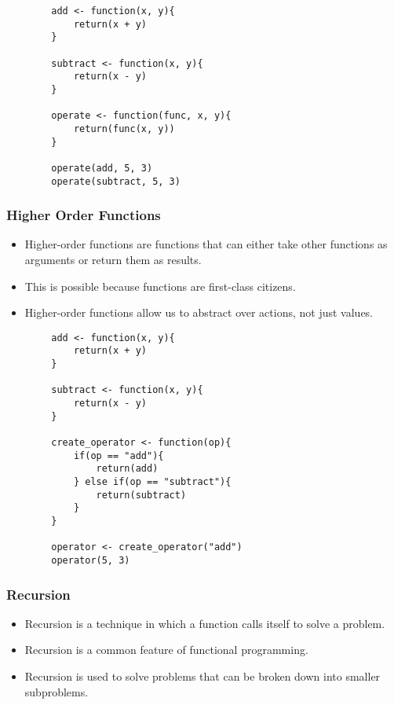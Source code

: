 \documentclass[serif, 9pt, aspectratio=32]{beamer}
\begin{document}
\begin{frame}[fragile]
    \begin{lstlisting}
        add <- function(x, y){
            return(x + y)
        }

        subtract <- function(x, y){
            return(x - y)
        }

        operate <- function(func, x, y){
            return(func(x, y))
        }

        operate(add, 5, 3)
        operate(subtract, 5, 3)
    \end{lstlisting}
\end{frame}

\begin{frame}
    \centering
    \frametitle{Higher Order Functions}
    \begin{itemize}
        \setlength{\itemsep}{2em}
        \item Higher-order functions are functions that can either take other functions as arguments or return them as results.
        \item This is possible because functions are first-class citizens.
        \item Higher-order functions allow us to abstract over actions, not just values.
    \end{itemize}
\end{frame}

\begin{frame}[fragile]
    \begin{lstlisting}
        add <- function(x, y){
            return(x + y)
        }

        subtract <- function(x, y){
            return(x - y)
        }

        create_operator <- function(op){
            if(op == "add"){
                return(add)
            } else if(op == "subtract"){
                return(subtract)
            }
        }

        operator <- create_operator("add")
        operator(5, 3)
    \end{lstlisting}
\end{frame}

\begin{frame}
    \centering
    \frametitle{Recursion}
    \begin{itemize}
        \setlength{\itemsep}{2em}
        \item Recursion is a technique in which a function calls itself to solve a problem.
        \item Recursion is a common feature of functional programming.
        \item Recursion is used to solve problems that can be broken down into smaller subproblems.
    \end{itemize}
\end{frame}
\end{document}
